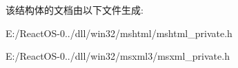 该结构体的文档由以下文件生成\+:\begin{DoxyCompactItemize}
\item 
E\+:/\+React\+O\+S-\/0../dll/win32/mshtml/mshtml\+\_\+private.\+h\item 
E\+:/\+React\+O\+S-\/0../dll/win32/msxml3/msxml\+\_\+private.\+h\end{DoxyCompactItemize}

